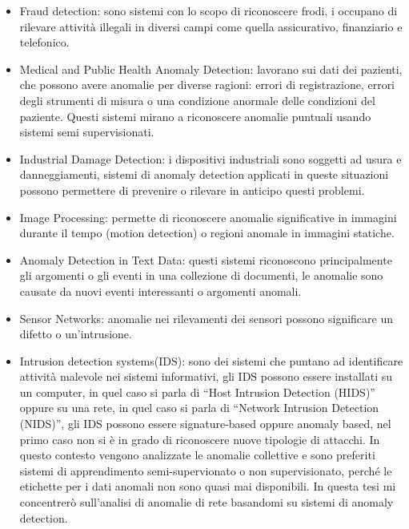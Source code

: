 \begin{itemize}

    \item Fraud detection: sono sistemi con lo scopo di riconoscere frodi, i occupano di rilevare attività illegali in diversi campi come quella assicurativo, finanziario e telefonico.
    \item Medical and Public Health Anomaly Detection: lavorano sui dati dei pazienti, che possono avere anomalie per diverse ragioni: errori di registrazione, errori degli strumenti di misura o una condizione anormale delle condizioni del paziente. Questi sistemi mirano a riconoscere anomalie puntuali usando sistemi semi supervisionati.
    \item Industrial Damage Detection: i dispositivi industriali sono soggetti ad usura e danneggiamenti, sistemi di anomaly detection applicati in queste situazioni possono permettere di prevenire o rilevare in anticipo questi problemi.
    \item Image Processing: permette di riconoscere anomalie significative in immagini durante il tempo (motion detection) o regioni anomale in immagini statiche.
    \item Anomaly Detection in Text Data: questi sistemi riconoscono principalmente gli argomenti o gli eventi in una collezione di documenti, le anomalie sono causate da nuovi eventi interessanti o argomenti anomali.
    \item Sensor Networks: anomalie nei rilevamenti dei sensori possono significare un difetto o un'intrusione.
    \item Intrusion detection systems(IDS): sono dei sistemi che puntano ad identificare attività malevole nei sistemi informativi, gli IDS possono essere installati su un computer, in quel caso si parla di ``Host Intrusion Detection (HIDS)'' oppure su una rete, in quel caso si parla di ``Network Intrusion Detection (NIDS)'', gli IDS possono essere signature-based oppure anomaly based, nel primo caso non si è in grado di riconoscere nuove tipologie di attacchi. In questo contesto vengono analizzate le anomalie collettive e sono preferiti sistemi di apprendimento semi-supervionato o non supervisionato, perché le etichette per i dati anomali non sono quasi mai disponibili. In questa tesi mi concentrerò sull'analisi di anomalie di rete basandomi su sistemi di anomaly detection. 
\end{itemize}

